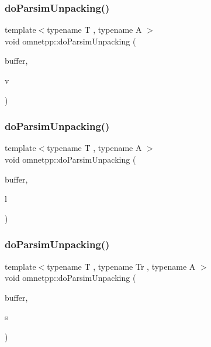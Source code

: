 \mbox{\label{namespaceomnetpp_a5d85de2bce765edaa5f7b1651f94f37c}} 
\subsubsection{\texorpdfstring{do\+Parsim\+Unpacking()}{doParsimUnpacking()}\hspace{0.1cm}{\footnotesize\ttfamily [1/5]}}
{\footnotesize\ttfamily template$<$typename T , typename A $>$ \\
void omnetpp\+::do\+Parsim\+Unpacking (\begin{DoxyParamCaption}\item[{omnetpp\+::c\+Comm\+Buffer $\ast$}]{buffer,  }\item[{std\+::vector$<$ T, A $>$ \&}]{v }\end{DoxyParamCaption})}

\mbox{\label{namespaceomnetpp_a28632f95fc2029c95828ed30e379f9ee}} 
\subsubsection{\texorpdfstring{do\+Parsim\+Unpacking()}{doParsimUnpacking()}\hspace{0.1cm}{\footnotesize\ttfamily [2/5]}}
{\footnotesize\ttfamily template$<$typename T , typename A $>$ \\
void omnetpp\+::do\+Parsim\+Unpacking (\begin{DoxyParamCaption}\item[{omnetpp\+::c\+Comm\+Buffer $\ast$}]{buffer,  }\item[{std\+::list$<$ T, A $>$ \&}]{l }\end{DoxyParamCaption})}

\mbox{\label{namespaceomnetpp_a8ae2ca4f89c4d2f8a95512b5b2936c79}} 
\subsubsection{\texorpdfstring{do\+Parsim\+Unpacking()}{doParsimUnpacking()}\hspace{0.1cm}{\footnotesize\ttfamily [3/5]}}
{\footnotesize\ttfamily template$<$typename T , typename Tr , typename A $>$ \\
void omnetpp\+::do\+Parsim\+Unpacking (\begin{DoxyParamCaption}\item[{omnetpp\+::c\+Comm\+Buffer $\ast$}]{buffer,  }\item[{std\+::set$<$ T, Tr, A $>$ \&}]{s }\end{DoxyParamCaption})}

